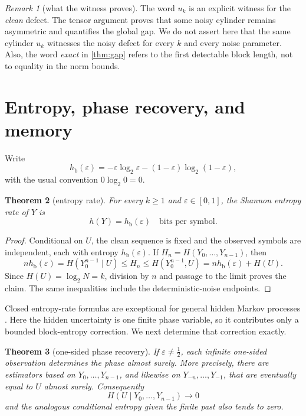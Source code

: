 \documentclass[11pt,a4paper]{amsart}
\newtheorem{theorem}{Theorem}[section]
\theoremstyle{definition}
\theoremstyle{remark}
\newtheorem{remark}[theorem]{Remark}
\newcommand{\hb}{h_{\mathrm b}}
\begin{document}
\begin{remark}[what the witness proves]\label{rem:noisy-witness}
The word $u_k$ is an explicit witness for the \emph{clean} defect.
The tensor argument proves that some noisy cylinder remains asymmetric and
quantifies the global gap.  We do not assert here that the same cylinder
$u_k$ witnesses the noisy defect for every $k$ and every noise parameter.
Also, the word \emph{exact} in \cref{thm:gap} refers to the first detectable
block length, not to equality in the norm bounds.
\end{remark}

\section{Entropy, phase recovery, and memory}

Write
\[
 \hb(\varepsilon)
 =-\varepsilon\log_2\varepsilon
  -(1-\varepsilon)\log_2(1-\varepsilon),
\]
with the usual convention $0\log_2 0=0$.

\begin{theorem}[entropy rate]\label{thm:entropy}
For every $k\geq1$ and $\varepsilon\in[0,1]$, the Shannon entropy rate of
$Y$ is
\[
 h(Y)=\hb(\varepsilon)\quad\text{bits per symbol}.
\]
\end{theorem}

\begin{proof}
Conditional on $U$, the clean sequence is fixed and the observed symbols are
independent, each with entropy $\hb(\varepsilon)$.  If
$H_n=H(Y_0,\ldots,Y_{n-1})$, then
\[
 n\hb(\varepsilon)
 =H(Y_0^{n-1}\mid U)
 \leq H_n
 \leq H(Y_0^{n-1},U)
 =n\hb(\varepsilon)+H(U).
\]
Since $H(U)=\log_2N=k$, division by $n$ and passage to the limit proves the
claim.  The same inequalities include the deterministic-noise endpoints.
\end{proof}

Closed entropy-rate formulas are exceptional for general hidden Markov
processes \cite{JacquetEtAl2008}.  Here the hidden uncertainty is one finite
phase variable, so it contributes only a bounded block-entropy correction.
We next determine that correction exactly.

\begin{theorem}[one-sided phase recovery]\label{thm:recovery}
If $\varepsilon\neq\tfrac12$, each infinite one-sided observation determines
the phase almost surely.  More precisely, there are estimators based on
$Y_0,\ldots,Y_{n-1}$, and likewise on $Y_{-n},\ldots,Y_{-1}$, that are
eventually equal to $U$ almost surely.  Consequently
\[
 H(U\mid Y_0,\ldots,Y_{n-1})\longrightarrow0
\]
and the analogous conditional entropy given the finite past also tends to
zero.
\end{theorem}
\end{document}
